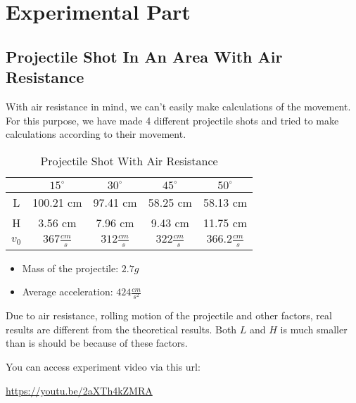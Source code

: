 \chapter{Experimental Part}

\section{Projectile Shot In An Area With Air Resistance}
With air resistance in mind, we can’t easily make calculations of the movement. For this purpose, we have made 4 different projectile shots and tried to make calculations according to their movement. 

\begin{table}[h]
    \centering
    \begin{tabular}{|c|c|c|c|c|}
    \hline
      & $15^{\circ}$        & $30^{\circ}$       & $45^{\circ}$       & $50^{\circ}$         \\ \hline
    L & 100.21 cm & 97.41 cm & 58.25 cm & 58.13 cm   \\ \hline
    H & 3.56 cm   & 7.96 cm  & 9.43 cm  & 11.75 cm   \\ \hline
    $v_0$ & $367 \frac{cm}{s}$  & $312 \frac{cm}{s}$ & $322 \frac{cm}{s}$ & $366.2 \frac{cm}{s}$ \\ \hline
    \end{tabular}
    \caption{Projectile Shot With Air Resistance}
\end{table}

\begin{itemize}
    \item Mass of the projectile: $2.7g$
    \item Average acceleration: $424 \frac{cm}{s^2}$
\end{itemize}

\noindent Due to air resistance, rolling motion of the projectile and other factors, real results are different from the theoretical results. Both $L$ and $H$ is much smaller than is should be because of these factors. 

You can access experiment video via this url: 

\url{https://youtu.be/2aXTh4kZMRA}
